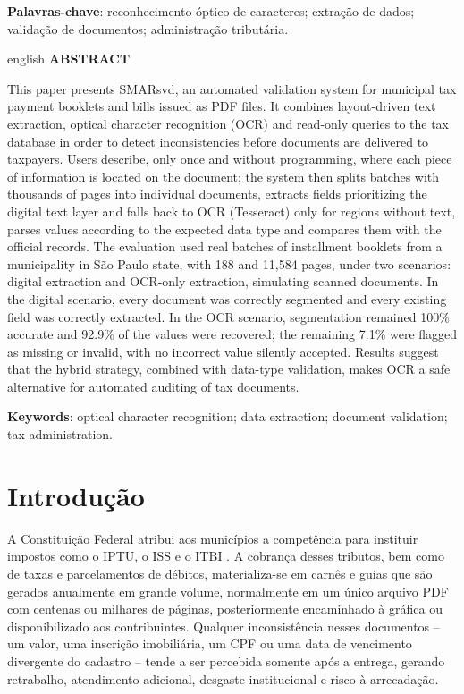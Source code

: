 \documentclass[article,12pt,oneside,a4paper,english,brazil]{abntex2}
\begin{document}
\noindent\textbf{Palavras-chave}: reconhecimento óptico de caracteres; extração de dados;
validação de documentos; administração tributária.

\begin{otherlanguage*}{english}
\noindent\textbf{ABSTRACT}\par
\noindent This paper presents SMARsvd, an automated validation system for municipal tax
payment booklets and bills issued as PDF files. It combines layout-driven text
extraction, optical character recognition (OCR) and read-only queries to the tax
database in order to detect inconsistencies before documents are delivered to
taxpayers. Users describe, only once and without programming, where each piece of
information is located on the document; the system then splits batches with thousands
of pages into individual documents, extracts fields prioritizing the digital text
layer and falls back to OCR (Tesseract) only for regions without text, parses values
according to the expected data type and compares them with the official records. The
evaluation used real batches of installment booklets from a municipality in São Paulo
state, with 188 and 11,584 pages, under two scenarios: digital extraction and OCR-only
extraction, simulating scanned documents. In the digital scenario, every document was
correctly segmented and every existing field was correctly extracted. In the OCR
scenario, segmentation remained 100\% accurate and 92.9\% of the values were recovered;
the remaining 7.1\% were flagged as missing or invalid, with no incorrect value
silently accepted. Results suggest that the hybrid strategy, combined with data-type
validation, makes OCR a safe alternative for automated auditing of tax documents.

\noindent\textbf{Keywords}: optical character recognition; data extraction; document
validation; tax administration.
\end{otherlanguage*}

\section{Introdução}

A Constituição Federal atribui aos municípios a competência para instituir impostos
como o IPTU, o ISS e o ITBI \cite{brasil1988}. A cobrança desses tributos, bem como
de taxas e parcelamentos de débitos, materializa-se em carnês e guias que são gerados
anualmente em grande volume, normalmente em um único arquivo PDF com centenas ou
milhares de páginas, posteriormente encaminhado à gráfica ou disponibilizado aos
contribuintes. Qualquer inconsistência nesses documentos -- um valor, uma inscrição
imobiliária, um CPF ou uma data de vencimento divergente do cadastro -- tende a ser
percebida somente após a entrega, gerando retrabalho, atendimento adicional, desgaste
institucional e risco à arrecadação.
\end{document}
